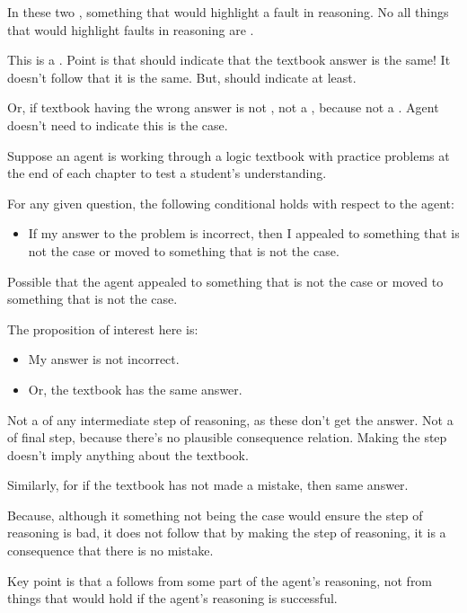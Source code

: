 \begin{note}
  In these two , something that would highlight a fault in reasoning.
  No all things that would highlight faults in reasoning are .
\end{note}


\begin{note}
  {
    \color{red}
    This is a \requ{}.
    Point is that should indicate that the textbook answer is the same!
    It doesn't follow that it is the same.
    But, should indicate at least.

    Or, if textbook having the wrong answer is not \epVAd{}, not a \requ{}, because not a \result{}.
    Agent doesn't need to indicate this is the case.
  }
  \begin{illustration}
    \label{illu:textbook-answers}
    Suppose an agent is working through a logic textbook with practice problems at the end of each chapter to test a student's understanding.

    For any given question, the following conditional holds with respect to the agent:
    \begin{itemize}
    \item If my answer to the problem is incorrect, then I {\color{red} appealed to something that is not the case or moved to something that is not the case}.
    \end{itemize}
  \end{illustration}
  Possible that the agent {\color{red} appealed to something that is not the case or moved to something that is not the case}.

  The proposition of interest here is:
  \begin{itemize}
  \item My answer is not incorrect.
  \item Or, the textbook has the same answer.
  \end{itemize}

  Not a \requ{} of any intermediate step of reasoning, as these don't get the answer.
  Not a \requ{} of final step, because there's no plausible consequence relation.
  Making the step doesn't imply anything about the textbook.

  Similarly, for if the textbook has not made a mistake, then same answer.

  Because, although it something not being the case would ensure the step of reasoning is bad, it does not follow that by making the step of reasoning, it is a consequence that there is no mistake.

  Key point is that a \requ{} follows from some part of the agent's reasoning, not from things that would hold if the agent's reasoning is successful.
\end{note}


